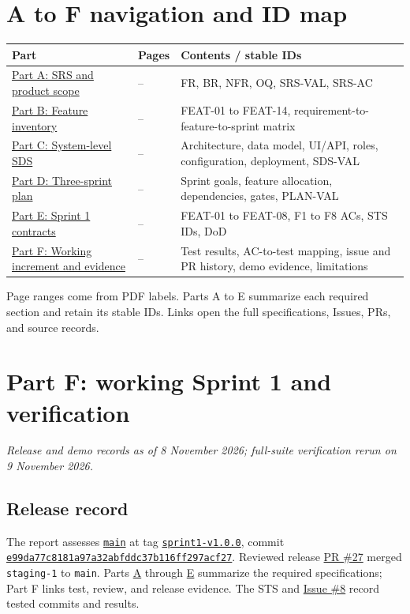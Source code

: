\documentclass[10pt,a4paper]{article}
\newcommand{\navrow}[3]{\hyperref[part:#1:start]{#2} & \pageref{part:#1:start}--\pageref{part:#1:end} & #3 \\\midrule}
\newcommand{\IssueLink}[1]{\href{https://github.com/ovenmakemeheat/Pockit/issues/#1}{Issue \##1}}
\newcommand{\PRLink}[1]{\href{https://github.com/ovenmakemeheat/Pockit/pull/#1}{PR \##1}}
\newcommand{\ReleaseTagLink}{\href{https://github.com/ovenmakemeheat/Pockit/releases/tag/sprint1-v1.0.0}{\texttt{sprint1-v1.0.0}}}
\newcommand{\ReleaseCommitLink}{\href{https://github.com/ovenmakemeheat/Pockit/commit/e99da77c8181a97a32abfddc37b116ff297acf27}{\texttt{e99da77c\allowbreak{}8181a97a\allowbreak{}32abfddc\allowbreak{}37b116ff\allowbreak{}297acf27}}}
\newcommand{\PartLink}[2]{\hyperref[part:#1:start]{#2}}
\begin{document}
\tableofcontents
\clearpage
\section*{A to F navigation and ID map}
\small
\begin{longtable}{@{}p{}p{}p{}@{}}
\toprule
\textbf{Part} & \textbf{Pages} & \textbf{Contents / stable IDs} \\\midrule
\navrow{A}{Part A: SRS and product scope}{FR, BR, NFR, OQ, SRS-VAL, SRS-AC}
\navrow{B}{Part B: Feature inventory}{FEAT-01 to FEAT-14, requirement-to-feature-to-sprint matrix}
\navrow{C}{Part C: System-level SDS}{Architecture, data model, UI/API, roles, configuration, deployment, SDS-VAL}
\navrow{D}{Part D: Three-sprint plan}{Sprint goals, feature allocation, dependencies, gates, PLAN-VAL}
\navrow{E}{Part E: Sprint 1 contracts}{FEAT-01 to FEAT-08, F1 to F8 ACs, STS IDs, DoD}
\navrow{F}{Part F: Working increment and evidence}{Test results, AC-to-test mapping, issue and PR history, demo evidence, limitations}
\bottomrule
\end{longtable}
\normalsize
\noindent Page ranges come from PDF labels. Parts A to E summarize each required section and retain its stable IDs. Links open the full specifications, Issues, PRs, and source records.
\clearpage
{}



\clearpage
\section{Part F: working Sprint 1 and verification}
\label{part:F:start}
\noindent\textit{Release and demo records as of 8 November 2026; full-suite verification rerun on 9 November 2026.}\par\medskip

\subsection{Release record}
The report assesses \href{https://github.com/ovenmakemeheat/Pockit/tree/main}{\texttt{main}} at tag \ReleaseTagLink{}, commit \ReleaseCommitLink{}. Reviewed release \PRLink{27} merged \texttt{staging-1} to \texttt{main}. Parts \PartLink{A}{A} through \PartLink{E}{E} summarize the required specifications; Part F links test, review, and release evidence. The STS and \IssueLink{8} record tested commits and results.
\end{document}
